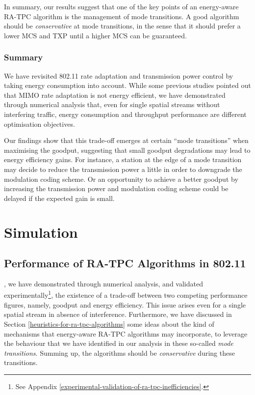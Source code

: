 \documentclass[twoside,nohyper]{tufte-book}
\newcommand{\partseparator}{
  \noindent\leavevmode\leaders\hrule height 0.8ex depth \dimexpr0.4pt-0.8ex\hfill\kern0pt
  \newline~\vspace{-0.5\baselineskip}\newline}
\theoremstyle{definition}
\theoremstyle{definition}
\theoremstyle{definition}
\theoremstyle{remark}
\begin{document}
In summary, our results suggest that one of the key points of an
energy-aware RA-TPC algorithm is the management of mode transitions. A
good algorithm should be \emph{conservative} at mode transitions, in the
sense that it should prefer a lower MCS and TXP until a higher MCS can
be guaranteed.

\hypertarget{summary-3}{%
\section{Summary}\label{summary-3}}

We have revisited 802.11 rate adaptation and transmission power control
by taking energy consumption into account. While some previous studies
pointed out that MIMO rate adaptation is not energy efficient, we have
demonstrated through numerical analysis that, even for single spatial
streams without interfering traffic, energy consumption and throughput
performance are different optimisation objectives.

Our
findings\cite[0pt]{contrib-06}
show that this trade-off emerges at certain ``mode transitions'' when
maximising the goodput, suggesting that small goodput degradations may
lead to energy efficiency gains. For instance, a station at the edge of
a mode transition may decide to reduce the transmission power a little
in order to downgrade the modulation coding scheme. Or an opportunity to
achieve a better goodput by increasing the transmission power and
modulation coding scheme could be delayed if the expected gain is small.

\addtocontents{toc}{\partseparator}

\hypertarget{part-simulation}{%
\part{Simulation}\label{part-simulation}}

\hypertarget{ch:07}{%
\chapter{Performance of RA-TPC Algorithms in 802.11}\label{ch:07}}

, we have demonstrated through numerical analysis,
and validated experimentally\footnote{See Appendix
  \ref{experimental-validation-of-ra-tpc-inefficiencies}.}, the
existence of a trade-off between two competing performance figures,
namely, goodput and energy efficiency. This issue arises even for a
single spatial stream in absence of interference. Furthermore, we have
discussed in Section \ref{heuristics-for-ra-tpc-algorithms} some ideas
about the kind of mechanisms that energy-aware RA-TPC algorithms may
incorporate, to leverage the behaviour that we have identified in our
analysis in these so-called \emph{mode transitions}. Summing up, the
algorithms should be \emph{conservative} during these transitions.
\end{document}
